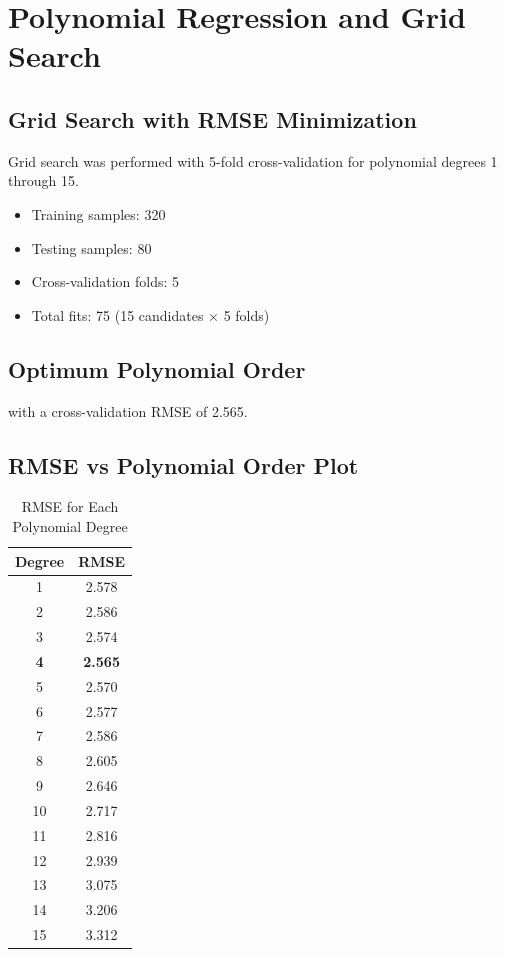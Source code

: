 \documentclass[12pt]{article}
\begin{document}
\newpage
\section{Polynomial Regression and Grid Search}

\subsection{Grid Search with RMSE Minimization}

Grid search was performed with 5-fold cross-validation for polynomial degrees 1 through 15.

\begin{itemize}
    \item Training samples: 320
    \item Testing samples: 80
    \item Cross-validation folds: 5
    \item Total fits: 75 (15 candidates × 5 folds)
\end{itemize}

\subsection{Optimum Polynomial Order}

 with a cross-validation RMSE of 2.565.

\subsection{RMSE vs Polynomial Order Plot}

\begin{table}[H]
\centering
\caption{RMSE for Each Polynomial Degree}
\begin{tabular}{cc}
\toprule
\textbf{Degree} & \textbf{RMSE} \\
\midrule
1 & 2.578 \\
2 & 2.586 \\
3 & 2.574 \\
\textbf{4} & \textbf{2.565} \\
5 & 2.570 \\
6 & 2.577 \\
7 & 2.586 \\
8 & 2.605 \\
9 & 2.646 \\
10 & 2.717 \\
11 & 2.816 \\
12 & 2.939 \\
13 & 3.075 \\
14 & 3.206 \\
15 & 3.312 \\
\bottomrule
\end{tabular}
\end{table}
\end{document}
